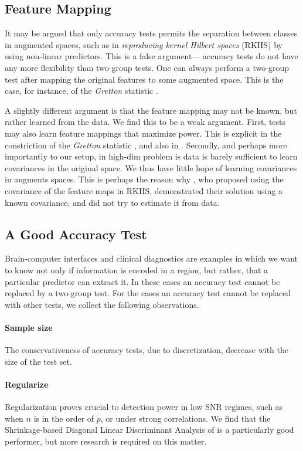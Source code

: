 \documentclass[journal]{IEEEtran}
\begin{document}
\subsection{Feature Mapping}
It may be argued that only accuracy tests permits the separation between classes in augmented spaces, such as in \emph{reproducing kernel Hilbert spaces} (RKHS) by using non-linear predictors. 
This is a false argument--- accuracy tests do not have any more flexibility than two-group tests. 
One can always perform a two-group test after mapping the original features to some augmented space. 
This is the case, for instance, of the \emph{Gretton} statistic \cite{gretton_kernel_2012-1}.

A slightly different argument is that the feature mapping may not be known, but rather learned from the data. 
We find this to be a weak argument.
First, tests may also learn feature mappings that maximize power. 
This is explicit in the constriction of the \emph{Gretton} statistic \cite{gretton_kernel_2012-1}, and also in \cite{vayatis_auc_2009}.
Secondly, and perhaps more importantly to our setup, in high-dim problem is data is barely sufficient to learn covariances in the original space. We thus have little hope of learning covariances in augments spaces. 
This is perhaps the reason why \cite{harchaoui2009kernel}, who proposed using the covariance of the feature maps in RKHS, demonstrated their solution using a known covariance, and did not try to estimate it from data. 


\subsection{A Good Accuracy Test}
Brain-computer interfaces and clinical diagnostics \cite{olivetti_induction_2012,wager_fmri-based_2013} are examples in which we want to know not only if information is encoded in a region, but rather, that a particular predictor can extract it. 
In these cases an accuracy test cannot be replaced by a two-group test. 
For the cases an accuracy test cannot be replaced with other tests, we collect the following observations.

\paragraph{Sample size} The conservativeness of accuracy tests, due to discretization, decrease with the size of the test set. 

\paragraph{Regularize}
Regularization proves crucial to detection power in low SNR regimes, such as when $n$ is in the order of $p$, or under strong correlations.
We find that the Shrinkage-based Diagonal Linear Discriminant Analysis of \cite{pang_shrinkage-based_2009} is a particularly good performer, but more research is required on this matter. 
\end{document}
